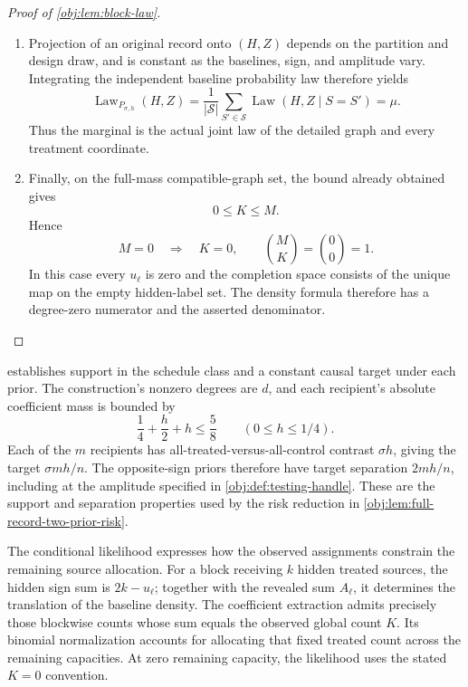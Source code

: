 \documentclass[11pt]{article}
\begin{document}
\begin{proof}[Proof of \cref{obj:lem:block-law}]
\begin{enumerate}
\item Projection of an original record onto \((H,Z)\) depends on the partition and design draw, and is constant as the baselines, sign, and amplitude vary. Integrating the independent baseline probability law therefore yields
\[
\operatorname{Law}_{P_{\sigma,h}}(H,Z)
=
\frac1{|\mathcal S|}
\sum_{S'\in\mathcal S}
\operatorname{Law}(H,Z\mid S=S')
=\mu.
\]
Thus the marginal is the actual joint law of the detailed graph and every treatment coordinate. %

\item Finally, on the full-mass compatible-graph set, the bound already obtained gives
\[
0\le K\le M.
\]
Hence
\[
M=0\quad\Longrightarrow\quad K=0,
\qquad
\binom{M}{K}=\binom00=1.
\]
In this case every \(u_\ell\) is zero and the completion space consists of the unique map on the empty hidden-label set. The density formula therefore has a degree-zero numerator and the asserted denominator. %
\end{enumerate}
\end{proof}

 establishes support in the schedule class and a constant causal target under each prior. The construction's nonzero degrees are \(d\), and each recipient's absolute coefficient mass is bounded by
\[
\frac14+\frac h2+h\le\frac58
\qquad(0\le h\le1/4).
\]
Each of the \(m\) recipients has all-treated-versus-all-control contrast \(\sigma h\), giving the target \(\sigma mh/n\). The opposite-sign priors therefore have target separation \(2mh/n\), including at the amplitude specified in \cref{obj:def:testing-handle}. These are the support and separation properties used by the risk reduction in \cref{obj:lem:full-record-two-prior-risk}.

The conditional likelihood expresses how the observed assignments constrain the remaining source allocation. For a block receiving \(k\) hidden treated sources, the hidden sign sum is \(2k-u_\ell\); together with the revealed sum \(A_\ell\), it determines the translation of the baseline density. The coefficient extraction admits precisely those blockwise counts whose sum equals the observed global count \(K\). Its binomial normalization accounts for allocating that fixed treated count across the remaining capacities. At zero remaining capacity, the likelihood uses the stated \(K=0\) convention.
\end{document}
